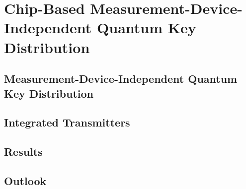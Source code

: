 %
%
\let\textcircled=\pgftextcircled
\chapter{Chip-Based Measurement-Device-Independent Quantum Key Distribution}
\label{chap:mdiqkd}

\section{Measurement-Device-Independent Quantum Key Distribution}
\label{sec:mdi-qkd}

\section{Integrated Transmitters}

\section{Results}

\section{Outlook}


